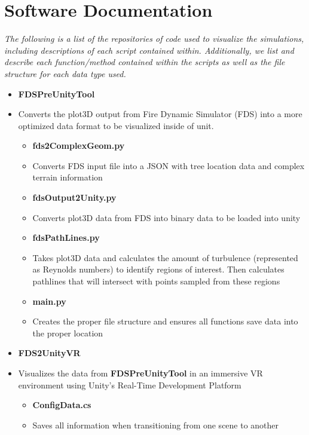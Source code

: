 
\chapter{Software Documentation} %
 \textit{The following is a list of the repositories of code used to visualize the simulations, including descriptions of each script contained within. Additionally, we list and describe each function/method contained within the scripts as well as the file structure for each data type used.} 
\newline
\newline
\label{Appendix-PreUnity} %
\begin{itemize}
\item \textbf{FDSPreUnityTool}
\item[]
Converts the plot3D output from Fire Dynamic Simulator (FDS) into a more optimized data format to be visualized inside of unit. 
   \begin{itemize}
        \item \textbf{fds2ComplexGeom.py}
        \item[] Converts FDS input file into a JSON with tree location data and complex terrain information
        \item \textbf{fdsOutput2Unity.py}
        \item[] Converts plot3D data from FDS into binary data to be loaded into unity
        \item \textbf{fdsPathLines.py}
        \item[] Takes plot3D data and calculates the amount of turbulence (represented as Reynolds numbers) to identify regions of interest. Then calculates pathlines that will intersect with points sampled from these regions
        \item \textbf{main.py}
        \item[] Creates the proper file structure and ensures all functions save data into the proper location  
   \end{itemize}
\pagebreak

\item \textbf{FDS2UnityVR}
\item[] Visualizes the data from \textbf{FDSPreUnityTool} in an immersive VR environment using Unity's Real-Time Development Platform    
   \begin{itemize}
        \item \textbf{ConfigData.cs}
        \item[] Saves all information when transitioning from one scene to another 


\end{itemize}
\end{itemize}
